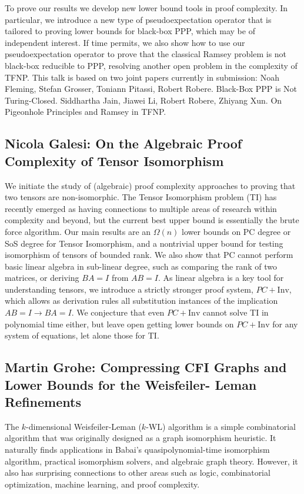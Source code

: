 \documentclass[11pt]{article}
\begin{document}
To prove our results we develop new lower bound tools in proof complexity. In particular, we introduce a new type of pseudoexpectation operator that is tailored to proving lower bounds for black-box PPP, which may be of independent interest. If time permits, we also show how to use our pseudoexpectation operator to prove that the classical Ramsey problem is not black-box reducible to PPP, resolving another open problem in the complexity of TFNP. This talk is based on two joint papers currently in submission: Noah Fleming, Stefan Grosser, Toniann Pitassi, Robert Robere. Black-Box PPP is Not Turing-Closed. Siddhartha Jain, Jiawei Li, Robert Robere, Zhiyang Xun. On Pigeonhole Principles and Ramsey in TFNP.

\subsection*{Nicola Galesi: On the Algebraic Proof Complexity of Tensor Isomorphism}\label{Galesi}

We initiate the study of (algebraic) proof complexity approaches to proving that two tensors are non-isomorphic. The Tensor Isomorphism problem (TI) has recently emerged as having connections to multiple areas of research within complexity and beyond, but the current best upper bound is essentially the brute force algorithm. 
Our main results are an $\Omega(n)$ lower bounds on PC degree or SoS degree for Tensor Isomorphism, and a nontrivial upper bound for testing isomorphism of tensors of bounded rank.
We also show that PC cannot perform basic linear algebra in sub-linear degree, such as comparing the rank of two matrices, or deriving $BA = I$ from $AB = I$. As linear algebra is a key tool for understanding tensors, we introduce a strictly stronger proof system, $PC+\mathrm{Inv}$, which allows as derivation rules all substitution instances of the implication $AB = I → BA = I$. We conjecture that even $PC+\mathrm{Inv}$ cannot solve TI in polynomial time either, but leave open getting lower bounds on $PC+\mathrm{Inv}$ for any system of equations, let alone those for TI. 


\subsection*{Martin Grohe: Compressing CFI Graphs and Lower Bounds for the Weisfeiler-
Leman Refinements}\label{Grohe}

The $k$-dimensional Weisfeiler-Leman ($k$-WL) algorithm is a simple combinatorial algorithm that was originally designed as a graph isomorphism heuristic. It naturally finds applications in Babai's quasipolynomial-time isomorphism algorithm, practical isomorphism solvers, and algebraic graph theory. However, it also has surprising connections to other areas such as logic, combinatorial optimization, machine learning, and proof complexity.
\end{document}
